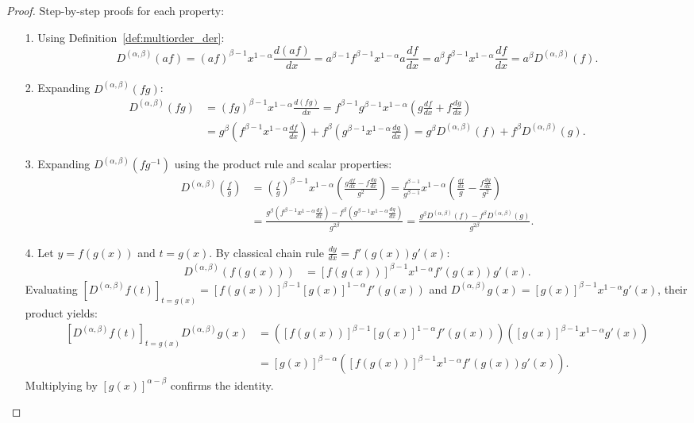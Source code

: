 \documentclass[oneside,10pt]{article}
\theoremstyle{plain}
\theoremstyle{definition}
\begin{document}
\begin{proof}
Step-by-step proofs for each property:
\begin{enumerate}
    \item[1.] Using Definition~\ref{def:multiorder_der}:
    \[
    D^{(\alpha,\beta)}(af) = (af)^{\beta-1} x^{1-\alpha} \frac{d(af)}{dx} = a^{\beta-1} f^{\beta-1} x^{1-\alpha} a \frac{df}{dx} = a^\beta f^{\beta-1} x^{1-\alpha} \frac{df}{dx} = a^\beta D^{(\alpha,\beta)}(f).
    \]

    \item[2.] Expanding $D^{(\alpha,\beta)}(fg)$:
    \begin{align*}
    D^{(\alpha,\beta)}(fg) &= (fg)^{\beta-1} x^{1-\alpha} \frac{d(fg)}{dx} = f^{\beta-1} g^{\beta-1} x^{1-\alpha} \left( g \frac{df}{dx} + f \frac{dg}{dx} \right) \\
    &= g^\beta \left( f^{\beta-1} x^{1-\alpha} \frac{df}{dx} \right) + f^\beta \left( g^{\beta-1} x^{1-\alpha} \frac{dg}{dx} \right) = g^\beta D^{(\alpha,\beta)}(f) + f^\beta D^{(\alpha,\beta)}(g).
    \end{align*}

    \item[3.] Expanding $D^{(\alpha,\beta)}\left(f g^{-1}\right)$ using the product rule and scalar properties:
    \begin{align*}
    D^{(\alpha,\beta)}\left(\frac{f}{g}\right) &= \left(\frac{f}{g}\right)^{\beta-1} x^{1-\alpha} \left( \frac{g \frac{df}{dx} - f \frac{dg}{dx}}{g^2} \right) = \frac{f^{\beta-1}}{g^{\beta-1}} x^{1-\alpha} \left( \frac{\frac{df}{dx}}{g} - \frac{f \frac{dg}{dx}}{g^2} \right) \\
    &= \frac{g^\beta \left( f^{\beta-1} x^{1-\alpha} \frac{df}{dx} \right) - f^\beta \left( g^{\beta-1} x^{1-\alpha} \frac{dg}{dx} \right)}{g^{2\beta}} = \frac{g^\beta D^{(\alpha,\beta)}(f) - f^\beta D^{(\alpha,\beta)}(g)}{g^{2\beta}}.
    \end{align*}

    \item[4.] Let $y = f(g(x))$ and $t = g(x)$. By classical chain rule $\frac{dy}{dx} = f'(g(x)) g'(x)$:
    \begin{align*}
    D^{(\alpha,\beta)}(f(g(x))) &= [f(g(x))]^{\beta-1} x^{1-\alpha} f'(g(x)) g'(x).
    \end{align*}
    Evaluating $\left[ D^{(\alpha,\beta)} f(t) \right]_{t=g(x)} = [f(g(x))]^{\beta-1} [g(x)]^{1-\alpha} f'(g(x))$ and $D^{(\alpha,\beta)}g(x) = [g(x)]^{\beta-1} x^{1-\alpha} g'(x)$, their product yields:
    \begin{align*}
    \left[ D^{(\alpha,\beta)} f(t) \right]_{t=g(x)} D^{(\alpha,\beta)} g(x) &= \left( [f(g(x))]^{\beta-1} [g(x)]^{1-\alpha} f'(g(x)) \right) \left( [g(x)]^{\beta-1} x^{1-\alpha} g'(x) \right) \\
    &= [g(x)]^{\beta-\alpha} \left( [f(g(x))]^{\beta-1} x^{1-\alpha} f'(g(x)) g'(x) \right).
    \end{align*}
    Multiplying by $[g(x)]^{\alpha-\beta}$ confirms the identity.


\end{enumerate}
\end{proof}
\end{document}
